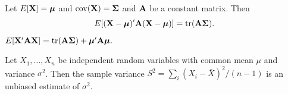 \btheo
Let $E[\mathbf{X}]=\mbox{\boldmath $\mu$}$ and $\mathrm{cov}(\mathbf{X})=\mathbf{\Sigma}$ and $\mathbf{A}$ be a constant
matrix. Then
$$E[(\mathbf{X}-\mbox{\boldmath $\mu$})'\mathbf{A}(\mathbf{X}-\mbox{\boldmath $\mu$})]=\mathrm{tr}(\mathbf{A}\mathbf{\Sigma}).$$
\estheo

\bstheo
$E[\mathbf{X}'\mathbf{A}\mathbf{X}]=\mathrm{tr}(\mathbf{A}\mathbf{\Sigma}) + \mbox{\boldmath $\mu$}'\mathbf{A}\mbox{\boldmath $\mu$}.$
\etheo

\bsexa
Let $X_1,\ldots,X_n$ be independent random variables with common mean
$\mu$ and variance $\sigma^2$.  Then the sample variance $S^2=\sum_i
(X_i-\bar{X})^2/(n-1)$ is an unbiased estimate of $\sigma^2$.
\eexa




%
%
%
%
%
